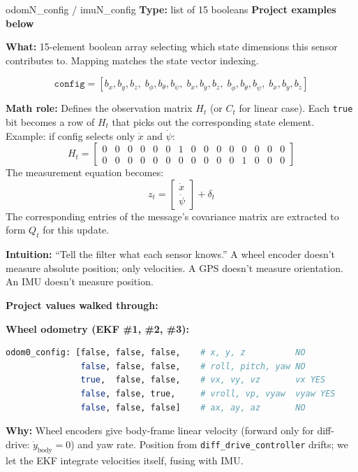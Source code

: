 \documentclass[11pt,a4paper]{article}
\begin{document}
\begin{paramcard}{odomN\_config / imuN\_config}
\textbf{Type:} list of 15 booleans \quad \textbf{Project examples below}

\textbf{What:} 15-element boolean array selecting which state dimensions this sensor contributes to. Mapping matches the state vector indexing.

\[
\texttt{config} = [b_x, b_y, b_z,\; b_\phi, b_\theta, b_\psi,\; b_{\dot{x}}, b_{\dot{y}}, b_{\dot{z}},\; b_{\dot{\phi}}, b_{\dot{\theta}}, b_{\dot{\psi}},\; b_{\ddot{x}}, b_{\ddot{y}}, b_{\ddot{z}}]
\]

\textbf{Math role:} Defines the observation matrix $H_t$ (or $C_t$ for linear case). Each \texttt{true} bit becomes a row of $H_t$ that picks out the corresponding state element. Example: if config selects only $\dot{x}$ and $\dot{\psi}$:
\[
H_t = \begin{bmatrix} 0 & 0 & 0 & 0 & 0 & 0 & \boxed{1} & 0 & 0 & 0 & 0 & 0 & 0 & 0 & 0 \\ 0 & 0 & 0 & 0 & 0 & 0 & 0 & 0 & 0 & 0 & 0 & \boxed{1} & 0 & 0 & 0 \end{bmatrix}
\]
The measurement equation becomes:
\[
z_t = \begin{bmatrix}\dot{x} \\ \dot{\psi}\end{bmatrix} + \delta_t
\]
The corresponding entries of the message's covariance matrix are extracted to form $Q_t$ for this update.

\textbf{Intuition:} ``Tell the filter what each sensor knows.'' A wheel encoder doesn't measure absolute position; only velocities. A GPS doesn't measure orientation. An IMU doesn't measure position.

\textbf{Project values walked through:}

\textbf{Wheel odometry (EKF \#1, \#2, \#3):}
\begin{lstlisting}[language=bash]
odom0_config: [false, false, false,    # x, y, z          NO
               false, false, false,    # roll, pitch, yaw NO
               true,  false, false,    # vx, vy, vz       vx YES
               false, false, true,     # vroll, vp, vyaw  vyaw YES
               false, false, false]    # ax, ay, az       NO
\end{lstlisting}
\textbf{Why:} Wheel encoders give body-frame linear velocity (forward only for diff-drive: $\dot{y}_{\text{body}} = 0$) and yaw rate. Position from \texttt{diff\_drive\_controller} drifts; we let the EKF integrate velocities itself, fusing with IMU.


\end{paramcard}
\end{document}
